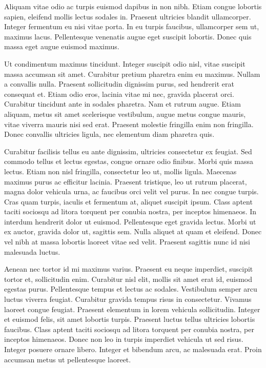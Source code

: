 \documentclass{custom_article}
\begin{document}
Aliquam vitae odio ac turpis euismod dapibus in non nibh. Etiam congue lobortis sapien, eleifend mollis lectus sodales in. Praesent ultricies blandit ullamcorper. Integer fermentum eu nisi vitae porta. In eu turpis faucibus, ullamcorper sem ut, maximus lacus. Pellentesque venenatis augue eget suscipit lobortis. Donec quis massa eget augue euismod maximus.

Ut condimentum maximus tincidunt. Integer suscipit odio nisl, vitae suscipit massa accumsan sit amet. Curabitur pretium pharetra enim eu maximus. Nullam a convallis nulla. Praesent sollicitudin dignissim purus, sed hendrerit erat consequat et. Etiam odio eros, lacinia vitae mi nec, gravida placerat orci. Curabitur tincidunt ante in sodales pharetra. Nam et rutrum augue. Etiam aliquam, metus sit amet scelerisque vestibulum, augue metus congue mauris, vitae viverra mauris nisi sed erat. Praesent molestie fringilla enim non fringilla. Donec convallis ultricies ligula, nec elementum diam pharetra quis.

Curabitur facilisis tellus eu ante dignissim, ultricies consectetur ex feugiat. Sed commodo tellus et lectus egestas, congue ornare odio finibus. Morbi quis massa lectus. Etiam non nisl fringilla, consectetur leo ut, mollis ligula. Maecenas maximus purus ac efficitur lacinia. Praesent tristique, leo ut rutrum placerat, magna dolor vehicula urna, ac faucibus orci velit vel purus. In nec congue turpis. Cras quam turpis, iaculis et fermentum at, aliquet suscipit ipsum. Class aptent taciti sociosqu ad litora torquent per conubia nostra, per inceptos himenaeos. In interdum hendrerit dolor ut euismod. Pellentesque eget gravida lectus. Morbi ut ex auctor, gravida dolor ut, sagittis sem. Nulla aliquet at quam et eleifend. Donec vel nibh at massa lobortis laoreet vitae sed velit. Praesent sagittis nunc id nisi malesuada luctus.

Aenean nec tortor id mi maximus varius. Praesent eu neque imperdiet, suscipit tortor et, sollicitudin enim. Curabitur nisl elit, mollis sit amet erat id, euismod egestas purus. Pellentesque tempus et lectus ac sodales. Vestibulum semper arcu luctus viverra feugiat. Curabitur gravida tempus risus in consectetur. Vivamus laoreet congue feugiat. Praesent elementum in lorem vehicula sollicitudin. Integer et euismod felis, sit amet lobortis turpis. Praesent luctus tellus ultricies lobortis faucibus. Class aptent taciti sociosqu ad litora torquent per conubia nostra, per inceptos himenaeos. Donec non leo in turpis imperdiet vehicula ut sed risus. Integer posuere ornare libero. Integer et bibendum arcu, ac malesuada erat. Proin accumsan metus ut pellentesque laoreet. 

\nocite{*}
\newpage
\printbibliography
\end{document}
